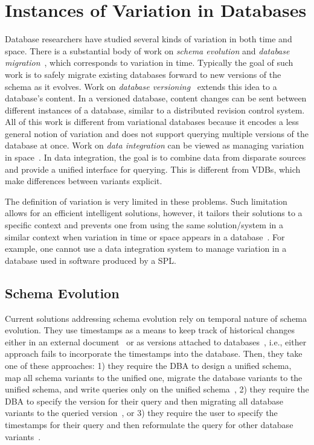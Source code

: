 \section{Instances of Variation in Databases}
\label{sec:vardbinstance}


Database researchers have studied several kinds of variation in
both time and space. There is a substantial body of work on \emph{schema
evolution} and \emph{database
migration}~\cite{Prism08Curino,prima08Moon,schEvolUnifyApp,schEvolIssues03Ram},
which corresponds to variation in time. Typically the goal of such work is to
safely migrate existing databases forward to new versions of the schema as it
evolves. 
%
Work on \emph{database versioning}~\cite{datasetVersioning,dbVersioning}
extends this idea to a database's content. In a versioned database, 
content changes can be sent between different instances of a database, similar
to a distributed revision control system.
%
All of this work is different from variational databases because it encodes a
less general notion of variation and does not support querying multiple
versions of the database at once.
%
Work on \emph{data integration} can be viewed as managing variation in
space~\cite{dataIntegBook}. In data integration, the goal is to combine data
from disparate sources and provide a unified interface for querying.
This is different from VDBs, which make differences between variants
explicit. %

 The definition of variation is very limited in these problems. Such
 limitation allows for an efficient intelligent solutions, however, it tailors
 their solutions to a specific context and prevents one from using the same
 solution/system in a similar context when variation in time or space appears
 in a database~\cite{schVersioningSurvey95Roddick}. For example, one cannot
 use a data integration system to manage variation in a database used in
 software produced by a SPL.


\subsection{Schema Evolution}
\label{sec:sch-evo}
Current solutions addressing schema evolution rely on
temporal nature of schema evolution. They use timestamps as a 
means to keep track of historical changes either in an external document~\cite{prima08Moon}
or as versions attached to 
databases~\cite{SchEvolRA90McKenzie, schVersioning97Castro, tempSchEvol91Ariav, tsql95Snodgrass}, 
i.e., either approach fails to incorporate
the timestamps into the database. 
Then, they take one of these approaches:
1) they require the DBA to design a unified schema, map all schema variants
to the unified one, migrate the database variants to the unified schema, and
write queries only on the unified schema~\cite{schEvolUnifyApp},
2) they require the DBA to specify the version for their query and then migrating
all database variants to the queried 
version~\cite{SchEvolRA90McKenzie, schVersioning97Castro, tempSchEvol91Ariav, tsql95Snodgrass},
or 3) they require the user to specify the timestamps for their query and
then reformulate the query for other database variants~\cite{prima08Moon}.


